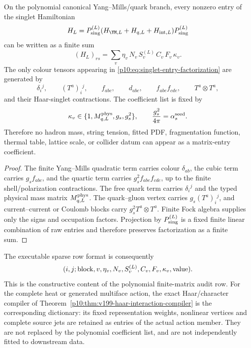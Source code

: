\documentclass[12pt,a4paper]{article}
\providecommand{\alphasseed}{\alpha_s^{\rm seed}}
\begin{document}
\begin{theorem}
\label{p10:thm:finite-qcd-sparse-entry-factorization}
On the polynomial canonical Yang--Mills/quark branch, every nonzero entry
of the singlet Hamiltonian
\[
H_L=P_{\rm sing}^{(L)}(H_{\YM,L}+H_{q,L}+H_{{\rm int},L})P_{\rm sing}^{(L)}
\]
can be written as a finite sum
\begin{equation}
\label{p10:eq:singlet-entry-factorization}
(H_L)_{rs}
=
\sum_v
\eta_v\,N_v\,S_v^{(L)}\,C_v\,F_v\,\kappa_v .
\end{equation}
The only colour tensors appearing in \eqref{p10:eq:singlet-entry-factorization} are generated by
\begin{equation}
\label{p10:eq:allowed-colour-tensors}
\delta_i{}^j,
\qquad
(T^a)_i{}^j,
\qquad
f_{abc},
\qquad
d_{abc},
\qquad
f_{abe}f_{cde},
\qquad
T^a\otimes T^a,
\end{equation}
and their Haar-singlet contractions.  The coefficient list is fixed by
\begin{equation}
\label{p10:eq:allowed-qcd-entry-coefficients}
\kappa_v\in
\{1,M_{q,L}^{\rm phys},g_s,g_s^2\},
\qquad
\frac{g_s^2}{4\pi}=\alphasseed .
\end{equation}
Therefore no hadron mass, string tension, fitted PDF, fragmentation function, thermal table, lattice scale, or collider datum can appear as a matrix-entry coefficient.
\end{theorem}
\begin{proof}
The finite Yang--Mills quadratic term carries colour \(\delta_{ab}\), the cubic term carries \(g_sf_{abc}\), and the quartic term carries \(g_s^2f_{abe}f_{cde}\), up to the finite shell/polarization contractions.  The free quark term carries \(\delta_i{}^j\) and the typed physical mass matrix \(M_{q,L}^{\rm phys}\).  The quark--gluon vertex carries \(g_s(T^a)_i{}^j\), and current--current or Coulomb blocks carry \(g_s^2T^a\otimes T^a\).  Finite Fock algebra supplies only the signs and occupation factors.  Projection by \(P_{\rm sing}^{(L)}\) is a fixed finite linear combination of raw entries and therefore preserves factorization as a finite sum.
\end{proof}

The executable sparse row format is consequently
\begin{equation}
\label{p10:eq:executable-sparse-row-format}
(i,j;{\rm block},v,\eta_v,N_v,S_v^{(L)},C_v,F_v,\kappa_v,{\rm value}).
\end{equation}
This is the constructive content of the polynomial finite-matrix audit
row. For the complete heat or generated multiface action, the exact
Haar/character compiler of Theorem~\ref{p10:thm:v199-haar-interaction-compiler}
is the corresponding dictionary: its fixed representation weights,
nonlinear vertices and complete source jets are retained as entries of the
actual action member. They are not replaced by the polynomial coefficient
list, and are not independently fitted to downstream data.
\end{document}

